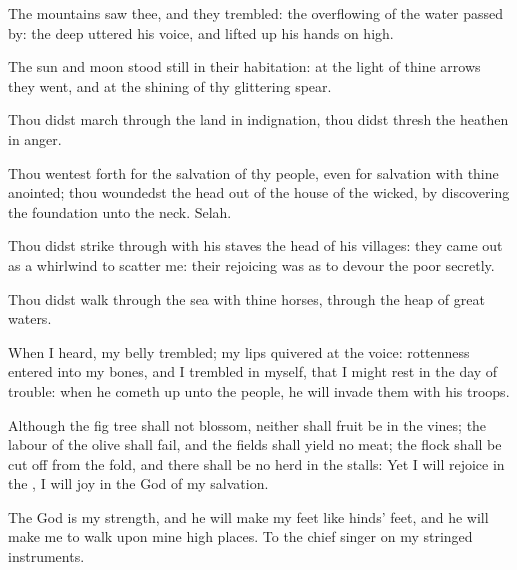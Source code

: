 \verse The mountains saw thee, and they trembled: the overflowing of the water passed by: the deep uttered his voice, and lifted up his hands on high.

\verse The sun and moon stood still in their habitation: at the light of thine arrows they went, and at the shining of thy glittering spear.

\verse Thou didst march through the land in indignation, thou didst thresh the heathen in anger.

\verse Thou wentest forth for the salvation of thy people, even for salvation with thine anointed; thou woundedst the head out of the house of the wicked, by discovering the foundation unto the neck.  Selah.

\verse Thou didst strike through with his staves the head of his villages: they came out as a whirlwind to scatter me: their rejoicing was as to devour the poor secretly.

\verse Thou didst walk through the sea with thine horses, through the heap of great waters.

\verse When I heard, my belly trembled; my lips quivered at the voice: rottenness entered into my bones, and I trembled in myself, that I might rest in the day of trouble: when he cometh up unto the people, he will invade them with his troops.

\verse Although the fig tree shall not blossom, neither shall fruit be in the vines; the labour of the olive shall fail, and the fields shall yield no meat; the flock shall be cut off from the fold, and there shall be no herd in the stalls: \verse Yet I will rejoice in the \LORD, I will joy in the God of my salvation.

\verse The \LORD God is my strength, and he will make my feet like hinds' feet, and he will make me to walk upon mine high places. To the chief singer on my stringed instruments.

